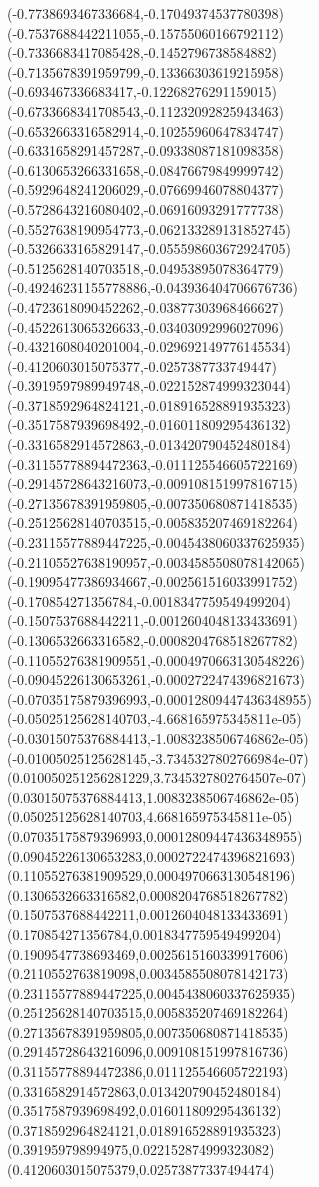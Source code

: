 {(-0.7738693467336684,-0.17049374537780398)
(-0.7537688442211055,-0.15755060166792112)
(-0.7336683417085428,-0.1452796738584882)
(-0.7135678391959799,-0.13366303619215958)
(-0.693467336683417,-0.12268276291159015)
(-0.6733668341708543,-0.11232092825943463)
(-0.6532663316582914,-0.10255960647834747)
(-0.6331658291457287,-0.09338087181098358)
(-0.6130653266331658,-0.08476679849999742)
(-0.5929648241206029,-0.07669946078804377)
(-0.5728643216080402,-0.06916093291777738)
(-0.5527638190954773,-0.062133289131852745)
(-0.5326633165829147,-0.055598603672924705)
(-0.5125628140703518,-0.04953895078364779)
(-0.49246231155778886,-0.043936404706676736)
(-0.4723618090452262,-0.03877303968466627)
(-0.4522613065326633,-0.03403092996027096)
(-0.4321608040201004,-0.029692149776145534)
(-0.4120603015075377,-0.0257387733749447)
(-0.3919597989949748,-0.022152874999323044)
(-0.3718592964824121,-0.018916528891935323)
(-0.3517587939698492,-0.016011809295436132)
(-0.3316582914572863,-0.013420790452480184)
(-0.31155778894472363,-0.011125546605722169)
(-0.29145728643216073,-0.009108151997816715)
(-0.27135678391959805,-0.007350680871418535)
(-0.25125628140703515,-0.005835207469182264)
(-0.23115577889447225,-0.0045438060337625935)
(-0.21105527638190957,-0.0034585508078142065)
(-0.19095477386934667,-0.002561516033991752)
(-0.170854271356784,-0.0018347759549499204)
(-0.1507537688442211,-0.0012604048133433691)
(-0.1306532663316582,-0.0008204768518267782)
(-0.11055276381909551,-0.0004970663130548226)
(-0.09045226130653261,-0.0002722474396821673)
(-0.07035175879396993,-0.00012809447436348955)
(-0.05025125628140703,-4.668165975345811e-05)
(-0.03015075376884413,-1.0083238506746862e-05)
(-0.01005025125628145,-3.7345327802766984e-07)
(0.010050251256281229,3.7345327802764507e-07)
(0.03015075376884413,1.0083238506746862e-05)
(0.05025125628140703,4.668165975345811e-05)
(0.07035175879396993,0.00012809447436348955)
(0.09045226130653283,0.0002722474396821693)
(0.11055276381909529,0.0004970663130548196)
(0.1306532663316582,0.0008204768518267782)
(0.1507537688442211,0.0012604048133433691)
(0.170854271356784,0.0018347759549499204)
(0.1909547738693469,0.0025615160339917606)
(0.2110552763819098,0.0034585508078142173)
(0.23115577889447225,0.0045438060337625935)
(0.25125628140703515,0.005835207469182264)
(0.27135678391959805,0.007350680871418535)
(0.29145728643216096,0.009108151997816736)
(0.31155778894472386,0.011125546605722193)
(0.3316582914572863,0.013420790452480184)
(0.3517587939698492,0.016011809295436132)
(0.3718592964824121,0.018916528891935323)
(0.391959798994975,0.022152874999323082)
(0.4120603015075379,0.02573877337494474)
}
